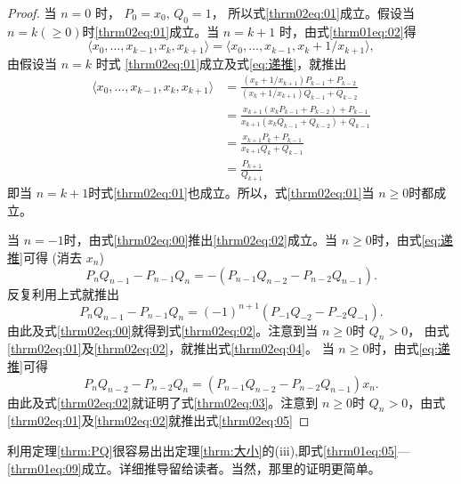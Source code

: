 \begin{proof}
	当 \( n = 0 \) 时， \( P_0 = x_0,\, Q_0 = 1 \)， 所以式\eqref{thrm02eq:01}成立。假设当 \( n = k(\geqslant 0) \)时\eqref{thrm02eq:01}成立。当 \( n = k + 1 \) 时，由式\eqref{thrm01eq:02}得
	\begin{equation*}
		\langle x_0, \dots, x_{k-1}, x_k, x_{k+1} \rangle = \langle x_0, \dots, x_{k-1}, x_k + 1/x_{k+1} \rangle,
	\end{equation*}
	由假设当 \( n = k \) 时式 \eqref{thrm02eq:01}成立及式\eqref{eq:递推}，就推出
	\begin{align*}
		\langle x_0, \dots, x_{k-1}, x_k, x_{k+1} \rangle
		 & = \frac{(x_k + 1/x_{k+1})P_{k-1}+P_{k-2}}{(x_k + 1/x_{k+1})Q_{k-1} + Q_{k-2}}           \\
		 & = \frac{x_{k+1}(x_kP_{k-1} + P_{k-2})+P_{k-1}}{x_{k+1}(x_kQ_{k-1} + Q_{k-2}) + Q_{k-1}} \\
		 & = \frac{x_{k+1}P_k + P_{k-1}}{x_{k+1}Q_k + Q_{k-1}}                                     \\
		 & = \frac{P_{k+1}}{Q_{k+1}}
	\end{align*}
	即当 \( n = k + 1 \)时式\eqref{thrm02eq:01}也成立。所以，式\eqref{thrm02eq:01}当 \( n \geqslant 0 \)时都成立。

	当 \( n = -1 \)时，由式\eqref{thrm02eq:00}推出\eqref{thrm02eq:02}成立。当 \( n \geqslant 0 \)时，由式\eqref{eq:递推}可得 (消去 \( x_n \))
	\begin{equation}
		P_nQ_{n-1} - P_{n-1}Q_n = -(P_{n-1}Q_{n-2} - P_{n-2}Q_{n-1}).
	\end{equation}
	反复利用上式就推出
	\begin{equation*}
		P_nQ_{n-1} - P_{n-1}Q_n = (-1)^{n+1}(P_{-1}Q_{-2} - P_{-2}Q_{-1}).
	\end{equation*}
	由此及式\eqref{thrm02eq:00}就得到式\eqref{thrm02eq:02}。注意到当 \( n \geqslant 0 \)时 \( Q_n > 0 \)，
	由式\eqref{thrm02eq:01}及\eqref{thrm02eq:02}，就推出式\eqref{thrm02eq:04}。
	当 \( n \geqslant 0 \)时，由式\eqref{eq:递推}可得
	\begin{equation}
		P_nQ_{n-2} - P_{n-2}Q_n = (P_{n-1}Q_{n-2} - P_{n-2}Q_{n-1})x_n.
	\end{equation}
	由此及式\eqref{thrm02eq:02}就证明了式\eqref{thrm02eq:03}。注意到 \( n \geqslant 0 \)时 \( Q_n > 0
	\)，由式\eqref{thrm02eq:01}及\eqref{thrm02eq:02}就推出式\eqref{thrm02eq:05}
\end{proof}
利用定理\ref{thrm:PQ}很容易出出定理\ref{thrm:大小}的(iii),即式\eqref{thrm01eq:05}---\eqref{thrm01eq:09}成立。详细推导留给读者。当然，那里的证明更简单。

